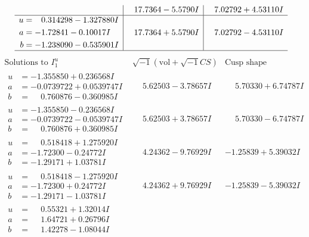 \documentclass[1p]{elsarticle_modified}
\theoremstyle{definition}
\newcommand{\I}{\sqrt{-1}}
\begin{document}
$$\begin{array}{c|c|c}
 & \phantom{-}17.7364 - 5.5790 I & \phantom{-}7.02792 + 4.53110 I \\ \hline\begin{aligned}
u &= \phantom{-}0.314298 - 1.327880 I \\
a &= -1.72841 - 0.10017 I \\
b &= -1.238090 - 0.535901 I\end{aligned}
 & \phantom{-}17.7364 + 5.5790 I & \phantom{-}7.02792 - 4.53110 I\\
 \hline 
 \end{array}$$\newpage$$\begin{array}{c|c|c}  
\text{Solutions to }I^u_{1}& \I (\text{vol} + \sqrt{-1}CS) & \text{Cusp shape}\\
 \hline 
\begin{aligned}
u &= -1.355850 + 0.236568 I \\
a &= -0.0739722 + 0.0539747 I \\
b &= \phantom{-}0.760876 - 0.360985 I\end{aligned}
 & \phantom{-}5.62503 - 3.78657 I & \phantom{-}5.70330 + 6.74787 I \\ \hline\begin{aligned}
u &= -1.355850 - 0.236568 I \\
a &= -0.0739722 - 0.0539747 I \\
b &= \phantom{-}0.760876 + 0.360985 I\end{aligned}
 & \phantom{-}5.62503 + 3.78657 I & \phantom{-}5.70330 - 6.74787 I \\ \hline\begin{aligned}
u &= \phantom{-}0.518418 + 1.275920 I \\
a &= -1.72300 - 0.24772 I \\
b &= -1.29171 + 1.03781 I\end{aligned}
 & \phantom{-}4.24362 - 9.76929 I & -1.25839 + 5.39032 I \\ \hline\begin{aligned}
u &= \phantom{-}0.518418 - 1.275920 I \\
a &= -1.72300 + 0.24772 I \\
b &= -1.29171 - 1.03781 I\end{aligned}
 & \phantom{-}4.24362 + 9.76929 I & -1.25839 - 5.39032 I \\ \hline\begin{aligned}
u &= \phantom{-}0.55321 + 1.32014 I \\
a &= \phantom{-}1.64721 + 0.26796 I \\
b &= \phantom{-}1.42278 - 1.08044 I\end{aligned}

\end{array}$$
\end{document}
